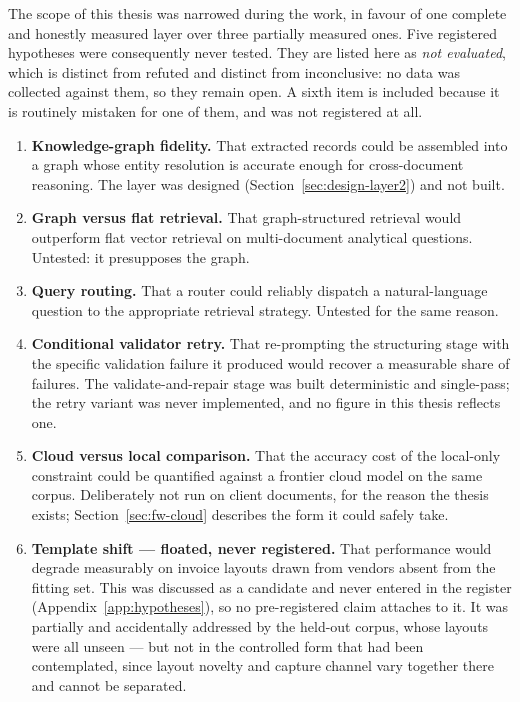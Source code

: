 The scope of this thesis was narrowed during the work, in favour of one complete and honestly
measured layer over three partially measured ones. Five registered hypotheses were consequently
never tested. They are listed here as \emph{not evaluated}, which is distinct from refuted and
distinct from inconclusive: no data was collected against them, so they remain open. A sixth item
is included because it is routinely mistaken for one of them, and was not registered at all.

\begin{enumerate}
  \item \textbf{Knowledge-graph fidelity.} That extracted records could be assembled into a
        graph whose entity resolution is accurate enough for cross-document reasoning. The layer
        was designed (Section~\ref{sec:design-layer2}) and not built.
  \item \textbf{Graph versus flat retrieval.} That graph-structured retrieval would outperform
        flat vector retrieval on multi-document analytical questions. Untested: it presupposes
        the graph.
  \item \textbf{Query routing.} That a router could reliably dispatch a natural-language question
        to the appropriate retrieval strategy. Untested for the same reason.
  \item \textbf{Conditional validator retry.} That re-prompting the structuring stage with the
        specific validation failure it produced would recover a measurable share of failures. The
        validate-and-repair stage was built deterministic and single-pass; the retry variant was
        never implemented, and no figure in this thesis reflects one.
  \item \textbf{Cloud versus local comparison.} That the accuracy cost of the local-only
        constraint could be quantified against a frontier cloud model on the same corpus.
        Deliberately not run on client documents, for the reason the thesis exists;
        Section~\ref{sec:fw-cloud} describes the form it could safely take.
  \item \textbf{Template shift --- floated, never registered.} That performance would degrade
        measurably on invoice layouts drawn from vendors absent from the fitting set. This was
        discussed as a candidate and never entered in the register
        (Appendix~\ref{app:hypotheses}), so no pre-registered claim attaches to it. It was
        partially and accidentally addressed by the held-out corpus, whose layouts were all
        unseen --- but not in the controlled form that had been contemplated, since layout
        novelty and capture channel vary together there and cannot be separated.
\end{enumerate}
